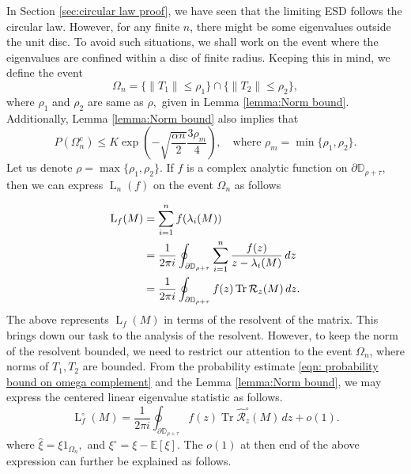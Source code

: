 \documentclass[12pt]{amsart}
\theoremstyle{plain}
\theoremstyle{definition}
\newcommand{\Tr}{\operatorname{Tr}}
\begin{document}
In Section \ref{sec:circular law proof}, we have seen that the limiting ESD follows the circular law. However, for any finite $n$, there might be some eigenvalues outside the unit disc. To avoid such situations, we shall work on the event where the eigenvalues are confined within a disc of finite radius. Keeping this in mind, we define the event
\begin{equation}
\Omega_{n} = \{\|T_1\| \leq \rho_1 \} \cap \{\|T_2\| \leq \rho_2 \} \label{eqn: event that T_1, T_2 are bounded},
\end{equation}
where $\rho_1$ and $\rho_2$ are same as $\rho,$ given in Lemma \ref{lemma:Norm bound}. Additionally, Lemma \ref{lemma:Norm bound} also implies that
\begin{equation}\label{eqn: probability bound on omega complement}
P\left(\Omega_n^{c}\right) \leq K \exp\left(-\sqrt{\frac{\alpha n}{2}} \frac{3 \rho_{m}}{4}\right), \quad \text{where } \rho_{m} = \min\{\rho_1, \rho_2\}.
\end{equation}
Let us denote $\rho=\max\{\rho_{1}, \rho_{2}\}.$ 
If $ f $ is a complex analytic function on $ \partial \mathbb{D}_{\rho+\tau} $, then we can express $\operatorname{L}_n(f) $ on the event $ \Omega_n $ as follows 

\begin{align}
\operatorname{L}_{f}(M)\notag
&= \sum_{i=1}^{n} f(\lambda_{i}(M)) \notag \\
&= \frac{1}{2\pi i} \oint_{\partial \mathbb{D}_{\rho+\tau}} \sum_{i=1}^{n} \frac{f(z)}{z-\lambda_{i}(M)}\, dz \notag \\
&= \frac{1}{2\pi i} \oint_{\partial \mathbb{D}_{\rho+\tau}} f(z) \Tr \mathcal{R}_{z}(M) \, dz. \notag
\end{align}
The above represents $\operatorname{L}_{f}(M)$ in terms of the resolvent of the matrix. This brings down our task to the analysis of the resolvent. However, to keep the norm of the resolvent bounded, we need to restrict our attention to the event $\Omega_{n}$, where norms of $T_{1}, T_{2}$ are bounded. From the probability estimate \eqref{eqn: probability bound on omega complement} and the Lemma \ref{lemma:Norm bound}, we may express the centered linear eigenvalue statistic as follows. 
$$
\operatorname{L}_{f}^{\circ}(M) = \frac{1}{2\pi i} \oint_{\partial \mathbb{D}_{\rho+\tau}} f(z) \Tr \hat{\mathcal{R}}_{z}^{\circ}(M) \, dz+o(1).
$$
where $\hat{\xi} = \xi1_{\Omega_{n}},$ and $\xi^{\circ} = \xi-\mathbb{E}[\xi].$ The $o(1)$ at then end of the above expression can further be explained as follows.
\end{document}
